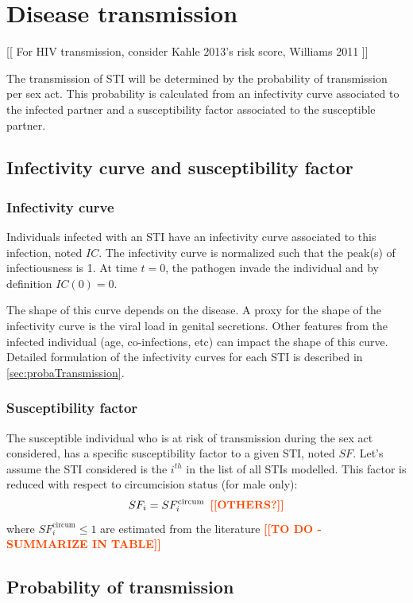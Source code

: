 \documentclass[11pt, onecolumn]{article}
\newcommand{\warning}[1]{\textbf{\textcolor{OrangeRed}{#1}}}
\begin{document}
\section{Disease transmission}

[[ For HIV transmission, consider Kahle 2013's risk score, Williams 2011 ]]

The transmission of STI will be determined by the probability of transmission per sex act. This probability is calculated from an infectivity curve associated to the infected partner and a susceptibility factor associated to the susceptible partner.

\subsection{Infectivity curve and susceptibility factor}

\subsubsection*{Infectivity curve}
Individuals infected with an STI have an infectivity curve associated to this infection, noted $IC$. The infectivity curve is normalized such that the peak(s) of infectiousness is 1. At time $t=0$, the pathogen invade the individual and by definition $IC(0)=0$.

The shape of this curve depends on the disease. A proxy for the shape of the infectivity curve is the viral load in genital secretions. Other features from the infected individual (age, co-infections, etc) can impact the shape of this curve. Detailed formulation of the infectivity curves for each STI is described in \ref{sec:probaTransmission}.

\subsubsection*{Susceptibility factor}
The susceptible individual who is at risk of transmission during the sex act considered, has a specific susceptibility factor to a given STI, noted $SF$. Let's assume the STI considered is the $i^{th}$ in the list of all STIs modelled. This factor is reduced with respect to circumcision status (for male only):
$$SF_i =SF_i^{\mathrm{circum}}  \,\,\, \warning{[[OTHERS?]]}$$
where $SF_i^{\mathrm{circum}}\leq 1$ are estimated from the literature \warning{[[TO DO - SUMMARIZE IN TABLE]]}


\subsection{Probability of transmission}
\end{document}
